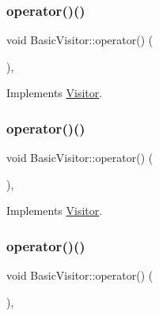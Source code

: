 \subsubsection{\texorpdfstring{operator()()}{operator()()}\hspace{0.1cm}{\footnotesize\ttfamily [29/59]}}
{\footnotesize\ttfamily void Basic\+Visitor\+::operator() (\begin{DoxyParamCaption}\item[{const \hyperlink{struct_while_statement}{While\+Statement} \&}]{ }\end{DoxyParamCaption})\hspace{0.3cm}{\ttfamily [inline]}, {\ttfamily [virtual]}}



Implements \hyperlink{struct_visitor_a4faef50c61a3c1246589390d925c2f53}{Visitor}.

\mbox{\label{struct_basic_visitor_a6a973ae3d27c06462637d6ddf5f5d9f1}} 
\subsubsection{\texorpdfstring{operator()()}{operator()()}\hspace{0.1cm}{\footnotesize\ttfamily [30/59]}}
{\footnotesize\ttfamily void Basic\+Visitor\+::operator() (\begin{DoxyParamCaption}\item[{const \hyperlink{struct_for_statement}{For\+Statement} \&}]{ }\end{DoxyParamCaption})\hspace{0.3cm}{\ttfamily [inline]}, {\ttfamily [virtual]}}



Implements \hyperlink{struct_visitor_a75180858faf5152f99742e4a19757928}{Visitor}.

\mbox{\label{struct_basic_visitor_a065fa15042daac02f409f3548cc2f687}} 
\subsubsection{\texorpdfstring{operator()()}{operator()()}\hspace{0.1cm}{\footnotesize\ttfamily [31/59]}}
{\footnotesize\ttfamily void Basic\+Visitor\+::operator() (\begin{DoxyParamCaption}\item[{const \hyperlink{struct_for_in_statement}{For\+In\+Statement} \&}]{ }\end{DoxyParamCaption})\hspace{0.3cm}{\ttfamily [inline]}, {\ttfamily [virtual]}}



